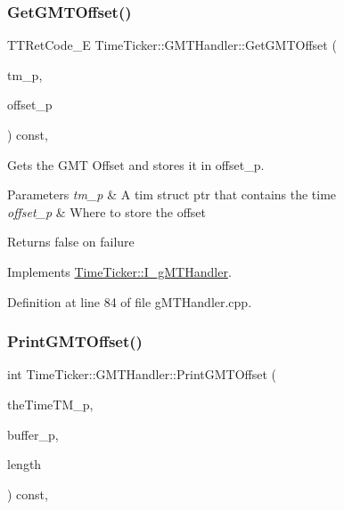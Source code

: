 \subsubsection{\texorpdfstring{GetGMTOffset()}{GetGMTOffset()}}
{\footnotesize\ttfamily T\+T\+Ret\+Code\+\_\+E Time\+Ticker\+::\+G\+M\+T\+Handler\+::\+Get\+G\+M\+T\+Offset (\begin{DoxyParamCaption}\item[{const struct tm $\ast$}]{tm\+\_\+p,  }\item[{\mbox{\hyperlink{structTTGMTOffset}{T\+T\+G\+M\+T\+Offset\+\_\+t}} $\ast$}]{offset\+\_\+p }\end{DoxyParamCaption}) const\hspace{0.3cm}{\ttfamily [override]}, {\ttfamily [virtual]}}



Gets the G\+MT Offset and stores it in offset\+\_\+p. 


\begin{DoxyParams}{Parameters}
{\em tm\+\_\+p} & A tim struct ptr that contains the time \\
\hline
{\em offset\+\_\+p} & Where to store the offset \\
\hline
\end{DoxyParams}
\begin{DoxyReturn}{Returns}
false on failure 
\end{DoxyReturn}


Implements \mbox{\hyperlink{classTimeTicker_1_1I__gMTHandler}{Time\+Ticker\+::\+I\+\_\+g\+M\+T\+Handler}}.



Definition at line 84 of file g\+M\+T\+Handler.\+cpp.

\mbox{\label{classTimeTicker_1_1GMTHandler_ae47cdc7af3fcd0b28aee668e35b8f696}} 
\subsubsection{\texorpdfstring{PrintGMTOffset()}{PrintGMTOffset()}}
{\footnotesize\ttfamily int Time\+Ticker\+::\+G\+M\+T\+Handler\+::\+Print\+G\+M\+T\+Offset (\begin{DoxyParamCaption}\item[{const struct tm $\ast$}]{the\+Time\+T\+M\+\_\+p,  }\item[{char $\ast$}]{buffer\+\_\+p,  }\item[{size\+\_\+t}]{length }\end{DoxyParamCaption}) const\hspace{0.3cm}{\ttfamily [override]}, {\ttfamily [virtual]}}



